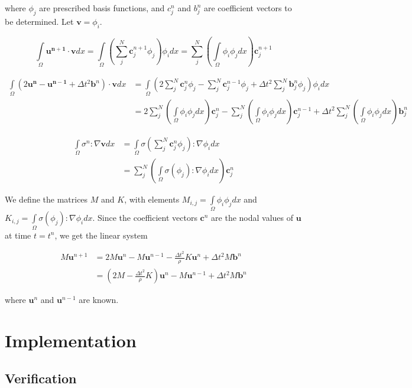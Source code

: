 \documentclass[twoside]{article}
\newcommand{\dtt}{\Delta t^2}
\newcommand{\unp}{\mathbf{u^{n+1}}}
\newcommand{\un}{\mathbf{u^{n}}}
\newcommand{\unm}{\mathbf{u^{n-1}}}
\newcommand{\io}{\int\limits_\Omega}
\newcommand{\sumjn}{\sum^N_j}
\begin{document}
where $\phi_j $ are prescribed basis functions, and $c_j^{n}$ and $b_j^{n}$ are coefficient vectors to be determined. Let $\mathbf{v} = \phi_i$.

\begin{equation}
\io\unp \cdot \mathbf{v} dx = \io\left(\sumjn \mathbf{c}_j^{n+1}\phi_j\right)\phi_i dx = \sumjn\left(\io \phi_i \phi_j dx\right)\mathbf{c}_j^{n+1}
\end{equation}

\begin{align}
\io (2\un - \unm  + \dtt \mathbf{b}^n) \cdot \mathbf{v} dx &= \io \left(2 \sumjn \mathbf{c}_j^{n}\phi_j - \sumjn \mathbf{c}_j^{n-1}\phi_j + \dtt \sumjn \mathbf{b}_j^{n}\phi_j \right)  \phi_i dx\\
&= 2 \sumjn \left(\io \phi_i  \phi_j dx\right)\mathbf{c}_j^{n} - \sumjn \left(\io \phi_i  \phi_j dx\right)\mathbf{c}_j^{n-1} + \dtt \sumjn \left(\io \phi_i  \phi_j dx\right)\mathbf{b}_j^{n}
\end{align}

\begin{align*}
\io \sigma^n : \nabla \mathbf{v} dx &= \io \sigma(\sumjn \mathbf{c}_j^{n}\phi_j) : \nabla \phi_i dx \\
&= \sumjn \left(\io \sigma(\phi_j) : \nabla\phi_i dx\right)\mathbf{c}_j^{n}
\end{align*}

We define the matrices $M$ and $K$, with elements $M_{i,j} = \io \phi_i   \phi_j dx$ and $K_{i,j} = \io \sigma(\phi_j) : \nabla\phi_i dx$. Since the coefficient vectors $\mathbf{c}^{n}$ are the nodal values of $\mathbf{u}$ at time $t=t^n$, we get the linear system

\begin{align}
M\mathbf{u}^{n+1} &= 2 M\mathbf{u}^{n} - M\mathbf{u}^{n-1} - \frac{\dtt}{\rho}K\mathbf{u}^{n} + \dtt M\mathbf{b}^n   \label{matrix:equation}\\
&= \left(2 M - \frac{\dtt}{\rho}K\right)\mathbf{u}^n - M\mathbf{u}^{n-1} + \dtt M\mathbf{b}^n
\end{align}

where $\mathbf{u}^{n}$ and $\mathbf{u}^{n-1}$ are known.




\section{Implementation}

\subsection{Verification}
\end{document}

